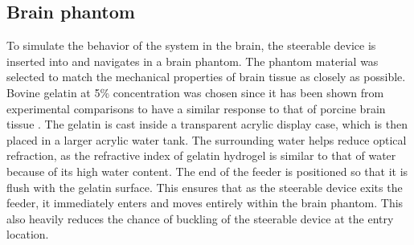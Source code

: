 \subsection{Brain phantom}
To simulate the behavior of the system in the brain, the steerable device is inserted into and navigates in a brain phantom. The phantom material was selected to match the mechanical properties of brain tissue as closely as possible. Bovine gelatin at 5\% concentration was chosen since it has been shown from experimental comparisons to have a similar response to that of porcine brain tissue \cite{singh_comparison_2019}.
\newline \newline
The gelatin is cast inside a transparent acrylic display case, which is then placed in a larger acrylic water tank. The surrounding water helps reduce optical refraction, as the refractive index of gelatin hydrogel is similar to that of water because of its high water content. The end of the feeder is positioned so that it is flush with the gelatin surface. This ensures that as the steerable device exits the feeder, it immediately enters and moves entirely within the brain phantom. This also heavily reduces the chance of buckling of the steerable device at the entry location.



